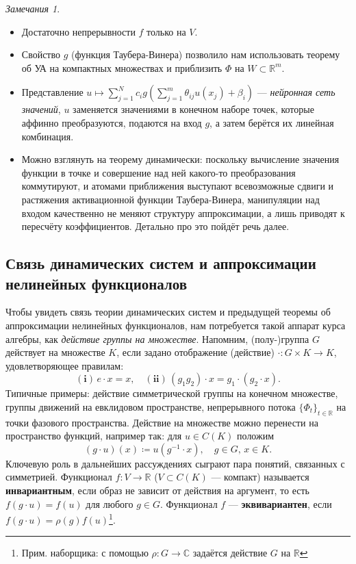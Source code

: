 \documentclass[a4paper, 12pt]{article}
\theoremstyle{definition}
\theoremstyle{plain}
\theoremstyle{remark}
\theoremstyle{remark}
\newtheorem*{remarks}{Замечания}
\theoremstyle{remark}
\begin{document}
\begin{remarks}
  \leavevmode
  \begin{itemize}
    \item Достаточно непрерывности $f$ только на $V$.
    \item Свойство $g$ (функция Таубера-Винера) позволило нам использовать теорему об УА на компактных множествах и приблизить $\Phi$ на $W \subset \mathbb{R}^m$.
    \item Представление $u \mapsto \sum_{j=1}^{N} c_i g(\sum_{j=1}^{m} \theta_{ij}u(x_j) + \beta_i)$ --- \emph{нейронная сеть значений}, $u$ заменяется значениями в конечном наборе точек, которые аффинно преобразуются, подаются на вход $g$, а затем берётся их линейная комбинация.
    \item Можно взглянуть на теорему динамически: поскольку вычисление значения функции в точке и совершение над ней какого-то преобразования коммутируют, и атомами приближения выступают всевозможные сдвиги и растяжения активационной функции Таубера-Винера, манипуляции над входом качественно не меняют структуру аппроксимации, а лишь приводят к пересчёту коэффициентов.
    Детально про это пойдёт речь далее.
  \end{itemize}
\end{remarks}

\subsection*{Связь динамических систем и аппроксимации нелинейных функционалов}  
Чтобы увидеть связь теории динамических систем и предыдущей теоремы об аппроксимации нелинейных функционалов, нам потребуется такой аппарат курса алгебры, как \emph{действие группы на множестве}.
Напомним, (полу-)группа $G$ действует на множестве $K$, если задано отображение (действие) $\cdot \colon G \times K \to K$, удовлетворяющее правилам:
$$\mathbf{(i)}\,e \cdot x = x, \quad \mathbf{(ii)}\,(g_1g_2) \cdot x = g_1 \cdot (g_2 \cdot x).$$
Типичные примеры: действие симметрической группы на конечном множестве, группы движений на евклидовом пространстве, непрерывного потока $\{\Phi_t\}_{t \in \mathbb{R}}$ на точки фазового пространства.
Действие на множестве можно перенести на пространство функций, например так: для $u \in C(K)$ положим
$$(g \cdot u)(x) \coloneq u(g^{-1} \cdot x), \quad g \in G, \, x \in K.$$
Ключевую роль в дальнейших рассуждениях сыграют пара понятий, связанных с симметрией.
Функционал $f\colon V \to \mathbb{R}$ ($V \subset C(K)$ --- компакт) называется \textbf{инвариантным}, если образ не зависит от действия на аргумент, то есть $f(g \cdot u) = f(u)$ для любого $g \in G$.
Функционал $f$ --- \textbf{эквивариантен}, если $f(g \cdot u) = \rho(g)f(u)$\footnote{Прим. наборщика: с помощью $\rho\colon G \to \mathbb{C}$ задаётся действие $G$ на $\mathbb{R}$}. 
\end{document}
